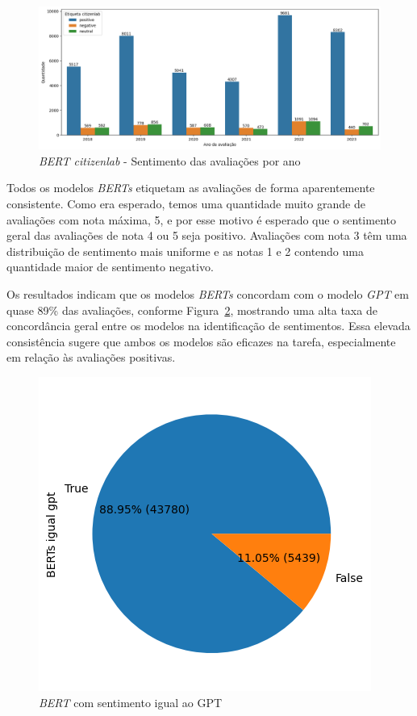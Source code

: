 \begin{figure}
	\centering
	\includegraphics[width=1\textwidth]{figs/bert/classificacao_citizenlab.png}
	\caption{\textit{BERT citizenlab} - Sentimento das avaliações por ano}
	\label{img:sentimento_citizenlab}
\end{figure}


Todos os modelos \textit{BERTs} etiquetam as avaliações de forma aparentemente consistente. Como era esperado, temos uma quantidade muito grande de avaliações com nota máxima, 5, e por esse motivo é esperado que o sentimento geral das avaliações de nota 4 ou 5 seja positivo. Avaliações com nota 3 têm uma distribuição de sentimento mais uniforme e as notas 1 e 2 contendo uma quantidade maior de sentimento negativo.

Os resultados indicam que os modelos \textit{BERTs} concordam com o modelo \textit{GPT} em quase 89\% das avaliações, conforme Figura~\ref{img:bert_vs_gpt}, mostrando uma alta taxa de concordância geral entre os modelos na identificação de sentimentos. Essa elevada consistência sugere que ambos os modelos são eficazes na tarefa, especialmente em relação às avaliações positivas.

\begin{figure}
	\centering
	\includegraphics{figs/bert/vs_gpt.png}
	\caption{\textit{BERT} com sentimento igual ao GPT}
	\label{img:bert_vs_gpt}
\end{figure}


